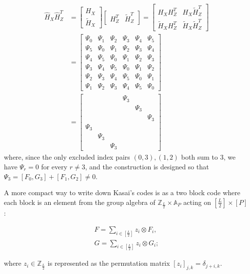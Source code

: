 \begin{align}
\hat H_X \hat H_Z^T 
&=\begin{bmatrix}H_X\\ \tilde H_X\end{bmatrix}
\begin{bmatrix}H_Z^T & \tilde H_Z^T\end{bmatrix}
=\begin{bmatrix}
H_X H_Z^T & H_X\tilde H_Z^T\\
\tilde H_X H_Z^T & \tilde H_X\tilde H_Z^T
\end{bmatrix}\\
&=\left[\begin{array}{ccc|ccc}
\Psi_0 & \Psi_1 & \Psi_2 & \Psi_3 & \Psi_4 & \Psi_5\\
\Psi_5 & \Psi_0 & \Psi_1 & \Psi_2 & \Psi_3 & \Psi_4\\
\Psi_4 & \Psi_5 & \Psi_0 & \Psi_1 & \Psi_2 & \Psi_3\\
\hline
\Psi_3 & \Psi_4 & \Psi_5 & \Psi_0 & \Psi_1 & \Psi_2\\
\Psi_2 & \Psi_3 & \Psi_4 & \Psi_5 & \Psi_0 & \Psi_1\\
\Psi_1 & \Psi_2 & \Psi_3 & \Psi_4 & \Psi_5 & \Psi_0
\end{array}\right] \\
&= 
\left[\begin{array}{ccc|ccc}
&&&\Psi_3&&\\
&&&&\Psi_3&\\
&&&&&\Psi_3\\
\hline
\Psi_3&&&&&\\
&\Psi_3&&&&\\
&&\Psi_3&&&
\end{array}\right]
\end{align}
where, since the only excluded index pairs $(0,3), (1,2)$ both sum to $3$, we have $\Psi_r = 0$ for every $r\neq 3$, and the construction is designed so that $\Psi_3 = [F_0,G_3] + [F_1,G_2]\neq 0$.

A more compact way to write down Kasai's codes is as a two block code where each block is an element from the group algebra of $\mathbb Z_{\frac{L}{2}}\times \mathbb A_P$ acting on $[\frac L2]\times [P]$:

\begin{align}
    F = \sum_{i \in [\frac{L}{2}]} z_i\otimes F_i,\\
    G = \sum_{i \in [\frac{L}{2}]} z_i\otimes G_i;
\end{align}

where $z_i  \in \mathbb Z_{\frac L2}$ is represented as the permutation matrix $[z_{i}]_{j ,k} = \delta_{j+i, k}$.

